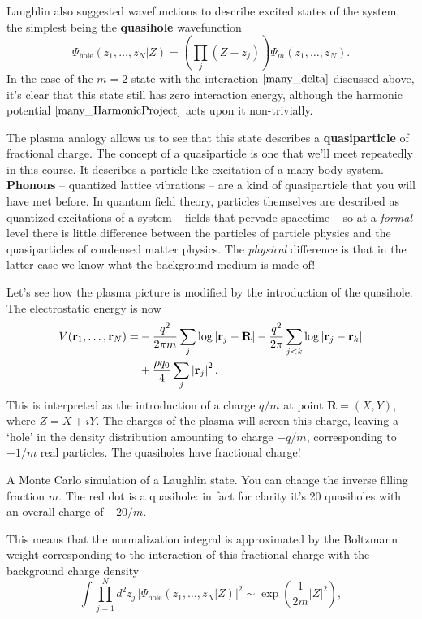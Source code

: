 \documentclass[
  letterpaper,
  DIV=11,
  numbers=noendperiod]{scrreprt}
\begin{document}
Laughlin also suggested wavefunctions to describe excited states of the
system, the simplest being the \textbf{quasihole} wavefunction \[
\Psi_\text{hole}(z_1,\ldots, z_N|Z) = \left(\prod_j (Z-z_j)\right)\Psi_m(z_1,\ldots, z_N).
\] In the case of the \(m=2\) state with the interaction
\(\eqref{many_delta}\) discussed above, it's clear that this state still
has zero interaction energy, although the harmonic potential
\(\eqref{many_HarmonicProject}\) acts upon it non-trivially.

The plasma analogy allows us to see that this state describes a
\textbf{quasiparticle} of fractional charge. The concept of a
quasiparticle is one that we'll meet repeatedly in this course. It
describes a particle-like excitation of a many body system.
\textbf{Phonons} -- quantized lattice vibrations -- are a kind of
quasiparticle that you will have met before. In quantum field theory,
particles themselves are described as quantized excitations of a system
-- fields that pervade spacetime -- so at a \emph{formal} level there is
little difference between the particles of particle physics and the
quasiparticles of condensed matter physics. The \emph{physical}
difference is that in the latter case we know what the background medium
is made of!

Let's see how the plasma picture is modified by the introduction of the
quasihole. The electrostatic energy is now \[
\begin{align}
V(\mathbf{r}_1, \ldots, \mathbf{r}_N)=&-\frac{q^2}{2\pi m}\sum_j \log\left|\mathbf{r}_j-\mathbf{R}\right|-\frac{q^2}{2\pi} \sum_{j<k}\log\left|\mathbf{r}_j-\mathbf{r}_k\right|\\
 &+ \frac{\rho q_0}{4}\sum_j \left|\mathbf{r}_j\right|^2.
\end{align}
\] This is interpreted as the introduction of a charge \(q/m\) at point
\(\mathbf{R} = (X, Y)\), where \(Z=X+iY\). The charges of the plasma
will screen this charge, leaving a `hole' in the density distribution
amounting to charge \(-q/m\), corresponding to \(-1/m\) real particles.
The quasiholes have fractional charge!

A Monte Carlo simulation of a Laughlin state. You can change the inverse
filling fraction \(m\). The red dot is a quasihole: in fact for clarity
it's 20 quasiholes with an overall charge of \(-20/m\).

This means that the normalization integral is approximated by the
Boltzmann weight corresponding to the interaction of this fractional
charge with the background charge density \[
\int \prod_{j=1}^N d^2z_j\,\left|\Psi_\text{hole}(z_1,\ldots, z_N|Z)\right|^2 \sim\exp\left(\frac{1}{2m}\left|Z\right|^2\right),
\]
\end{document}

